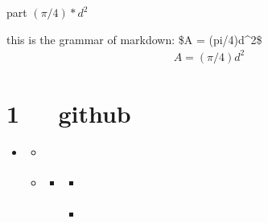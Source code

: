 \documentclass[letterpaper,12pt,english]{sphinxmanual}
\begin{document}
part \((\pi/4)*d^2\)

this is the grammar of markdown:
\$A = (pi/4)d\textasciicircum{}2\$
\begin{equation*}
\begin{split}A = (\pi/4)d^2\end{split}
\end{equation*}

\chapter{1   github}
\label{\detokenize{001software/001install/001._u7f51_u7ad9/github:github}}\label{\detokenize{001software/001install/001._u7f51_u7ad9/github::doc}}
\begin{sphinxShadowBox}
\begin{itemize}
\item {} 
\label{\detokenize{001software/001install/001._u7f51_u7ad9/github:id11}}{\hyperref[\detokenize{001software/001install/001._u7f51_u7ad9/github:github}]{}}
\begin{itemize}
\item {} 
\label{\detokenize{001software/001install/001._u7f51_u7ad9/github:id12}}{\hyperref[\detokenize{001software/001install/001._u7f51_u7ad9/github:id1}]{}}

\item {} 
\label{\detokenize{001software/001install/001._u7f51_u7ad9/github:id13}}{\hyperref[\detokenize{001software/001install/001._u7f51_u7ad9/github:id2}]{}}
\begin{itemize}
\item {} 
\label{\detokenize{001software/001install/001._u7f51_u7ad9/github:id14}}{\hyperref[\detokenize{001software/001install/001._u7f51_u7ad9/github:gitrepo}]{}}
\begin{itemize}
\item {} 
\label{\detokenize{001software/001install/001._u7f51_u7ad9/github:id15}}{\hyperref[\detokenize{001software/001install/001._u7f51_u7ad9/github:metastore-meta}]{}}

\item {} 
\label{\detokenize{001software/001install/001._u7f51_u7ad9/github:id16}}{\hyperref[\detokenize{001software/001install/001._u7f51_u7ad9/github:git-tools-git-restore-mtime-use-commit-times}]{}}


\end{itemize}
\end{itemize}
\end{itemize}
\end{itemize}
\end{sphinxShadowBox}
\end{document}
